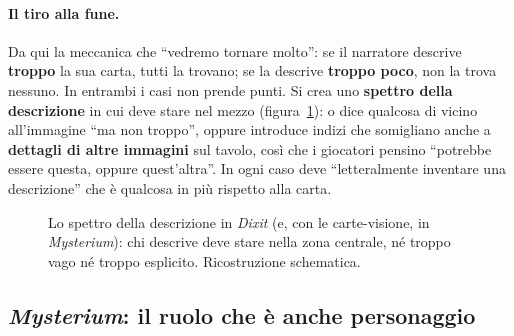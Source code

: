 \paragraph{Il tiro alla fune.} Da qui la meccanica che ``vedremo tornare molto'': se il
narratore descrive \textbf{troppo} la sua carta, tutti la trovano; se la descrive \textbf{troppo
poco}, non la trova nessuno. In entrambi i casi non prende punti. Si crea uno
\textbf{spettro della descrizione} in cui deve stare nel mezzo
(figura~\ref{a16:fig:spettro}): o dice qualcosa di vicino all'immagine ``ma non troppo'',
oppure introduce indizi che somigliano anche a \textbf{dettagli di altre immagini} sul tavolo,
così che i giocatori pensino ``potrebbe essere questa, oppure quest'altra''. In ogni caso deve
``letteralmente inventare una descrizione'' che è qualcosa in più rispetto alla carta.

\begin{figure}[htbp]
\centering
{}
\caption{Lo spettro della descrizione in \emph{Dixit} (e, con le carte-visione, in
\emph{Mysterium}): chi descrive deve stare nella zona centrale, né troppo vago né troppo
esplicito. Ricostruzione schematica.}
\label{a16:fig:spettro}
\end{figure}

\subsection{\emph{Mysterium}: il ruolo che è anche personaggio}



